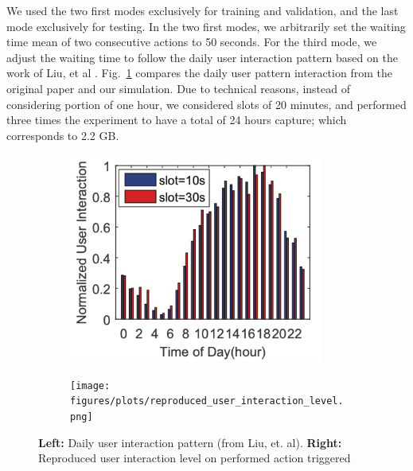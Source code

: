 We used the two first modes exclusively for training and validation, and the last mode exclusively for testing. In the two first modes, we arbitrarily set the waiting time mean of two consecutive actions to 50 seconds. For the third mode, we adjust the waiting time to follow the daily user interaction pattern based on the work of Liu, et al \cite{10.1145/3081333.3081351}. Fig.~\ref{fig:user_interaction_pattern} compares the daily user pattern interaction from the original paper and our simulation. Due to technical reasons, instead of considering portion of one hour, we considered slots of 20 minutes, and performed three times the experiment to have a total of 24 hours capture; which corresponds to 2.2 GB.





\begin{figure}[H]
\centering
\begin{subfigure}{.5\textwidth}
  \centering
  \includegraphics[width=0.92\textwidth]{figures/user interaction.png}
\end{subfigure}%
\begin{subfigure}{.5\textwidth}
  \centering
  \texttt{[image: figures/plots/reproduced\_user\_interaction\_level.png]}
\end{subfigure}
\caption{\textbf{Left:} Daily user interaction pattern (from Liu, et. al). \textbf{Right:} Reproduced user interaction level on performed action triggered}
\label{fig:user_interaction_pattern}
\end{figure}
\\
 

